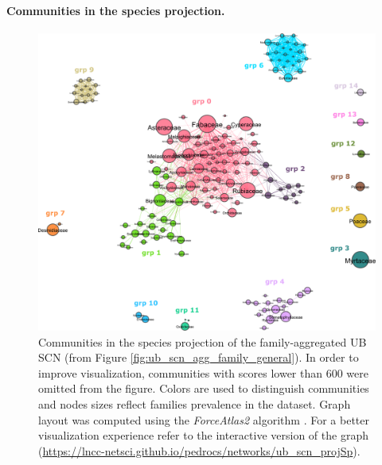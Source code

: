 \paragraph{Communities in the species projection.}
\begin{figure}[!ht]
  	\centering
    \includegraphics[width=\linewidth]{figures/casestudy_ub/scn_family_projSp_communities.pdf}
    \caption[Communities in the species projection of the family-aggregated UB SCN]{ Communities in the species projection of the family-aggregated UB SCN (from Figure \ref{fig:ub_scn_agg_family_general}). In order to improve visualization, communities with scores lower than $600$ were omitted from the figure. Colors are used to distinguish communities and nodes sizes reflect families prevalence in the dataset.
        Graph layout was computed using the \textit{ForceAtlas2} algorithm \cite{Jacomy2014}. For a better visualization experience refer to the interactive version of the graph (\url{https://lncc-netsci.github.io/pedrocs/networks/ub_scn_projSp}).}
    \label{fig:ub_scn_family_projSp_communities}
\end{figure}

